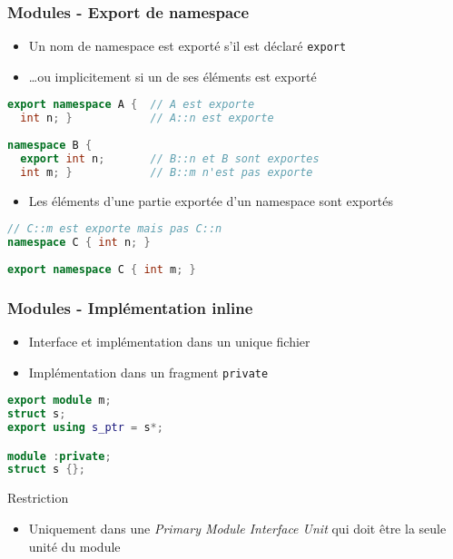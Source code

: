\documentclass[C++.tex]{subfiles}
\begin{document}
\begin{frame}[fragile]
	\frametitle{Modules - Export de namespace}
	\begin{itemize}
		\item Un nom de namespace est exporté s'il est déclaré \lstinline|export|
		\item \ldots{}ou implicitement si un de ses éléments est exporté
	\end{itemize}
	
	\begin{lstlisting}[language=C++]
export namespace A {  // A est exporte
  int n; }            // A::n est exporte
	
namespace B {
  export int n;       // B::n et B sont exportes
  int m; }            // B::m n'est pas exporte\end{lstlisting}
	
	\begin{itemize}
		\item Les éléments d'une partie exportée d'un namespace sont exportés
	\end{itemize}
	
	\begin{lstlisting}[language=C++]
// C::m est exporte mais pas C::n
namespace C { int n; }
	
export namespace C { int m; }\end{lstlisting}
\end{frame}

\begin{frame}[fragile]
	\frametitle{Modules - Implémentation inline}
	\begin{itemize}
		\item Interface et implémentation dans un unique fichier
		\item Implémentation dans un fragment \lstinline|private|
	\end{itemize}

	\begin{lstlisting}[language=C++]
export module m;
struct s;
export using s_ptr = s*;

module :private;
struct s {};\end{lstlisting}

	\pause

	\begin{alertblock}{Restriction}
		\begin{itemize}
			\item Uniquement dans une \textit{Primary Module Interface Unit} qui doit être la seule unité du module
		\end{itemize}
	\end{alertblock}
\end{frame}
\end{document}
